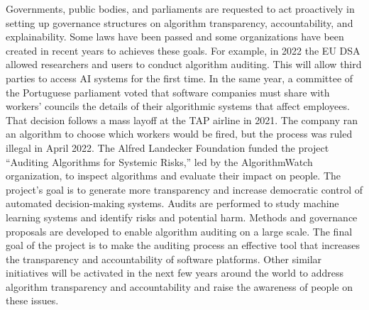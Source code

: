 Governments, public bodies, and parliaments are requested to act proactively in setting up governance structures on algorithm transparency, accountability, and explainability. Some laws have been passed and some organizations have been created in recent years to achieves these goals. For example, in 2022 the EU DSA allowed researchers and users to conduct algorithm auditing. This will allow third parties to access AI systems for the first time. In the same year, a committee of the Portuguese parliament voted that\vadjust{\vspace*{14pt}\pagebreak} software companies must share with workers' councils the details of their algorithmic systems that affect employees. That decision follows a mass layoff at the TAP airline in 2021. The company ran an algorithm to choose which workers would be fired, but the process was ruled illegal in April 2022. The Alfred Landecker Foundation funded the project ``Auditing Algorithms for Systemic Risks,'' led by the AlgorithmWatch organization, to inspect algorithms and evaluate their impact on people. The project's goal is to generate more transparency and increase democratic control of automated decision-making systems. Audits are performed to study machine learning systems and identify risks and potential harm. Methods and governance proposals are developed to enable algorithm auditing on a large scale. The final goal of the project is to make the auditing process an effective tool that increases the transparency and accountability of software platforms. Other similar initiatives will be activated in the next few years around the world to address algorithm transparency and accountability and raise the awareness of people on these issues.

